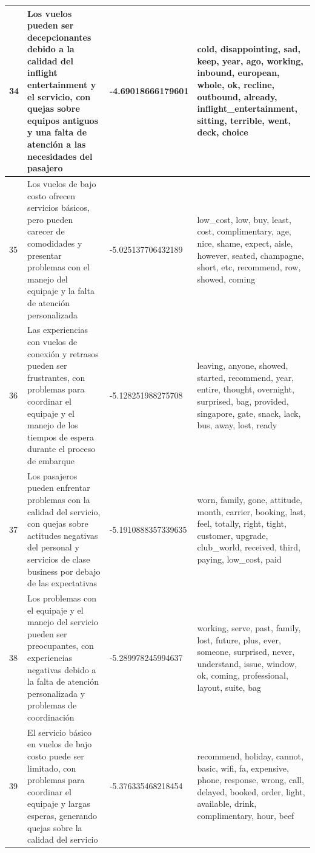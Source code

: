\documentclass{report}
\begin{document}
{\begin{longtable}{|p{1cm}|p{4cm}|p{4cm}|p{6cm}|}
                    \hline
                    34 & Los vuelos pueden ser decepcionantes debido a la calidad del inflight entertainment y el servicio, con quejas sobre equipos antiguos y una falta de atención a las necesidades del pasajero & -4.69018666179601 & cold, disappointing, sad, keep, year, ago, working, inbound, european, whole, ok, recline, outbound, already, inflight\_entertainment, sitting, terrible, went, deck, choice \\
                    \hline
                    35 & Los vuelos de bajo costo ofrecen servicios básicos, pero pueden carecer de comodidades y presentar problemas con el manejo del equipaje y la falta de atención personalizada & -5.025137706432189 & low\_cost, low, buy, least, cost, complimentary, age, nice, shame, expect, aisle, however, seated, champagne, short, etc, recommend, row, showed, coming \\
                    \hline
                    36 & Las experiencias con vuelos de conexión y retrasos pueden ser frustrantes, con problemas para coordinar el equipaje y el manejo de los tiempos de espera durante el proceso de embarque & -5.128251988275708 & leaving, anyone, showed, started, recommend, year, entire, thought, overnight, surprised, bag, provided, singapore, gate, snack, lack, bus, away, lost, ready \\
                    \hline
                    37 & Los pasajeros pueden enfrentar problemas con la calidad del servicio, con quejas sobre actitudes negativas del personal y servicios de clase business por debajo de las expectativas & -5.1910888357339635 & worn, family, gone, attitude, month, carrier, booking, last, feel, totally, right, tight, customer, upgrade, club\_world, received, third, paying, low\_cost, paid \\
                    \hline
                    38 & Los problemas con el equipaje y el manejo del servicio pueden ser preocupantes, con experiencias negativas debido a la falta de atención personalizada y problemas de coordinación & -5.289978245994637 & working, serve, past, family, lost, future, plus, ever, someone, surprised, never, understand, issue, window, ok, coming, professional, layout, suite, bag \\
                    \hline
                    39 & El servicio básico en vuelos de bajo costo puede ser limitado, con problemas para coordinar el equipaje y largas esperas, generando quejas sobre la calidad del servicio & -5.376335468218454 & recommend, holiday, cannot, basic, wifi, fa, expensive, phone, response, wrong, call, delayed, booked, order, light, available, drink, complimentary, hour, beef \\

\end{longtable}}
\end{document}
